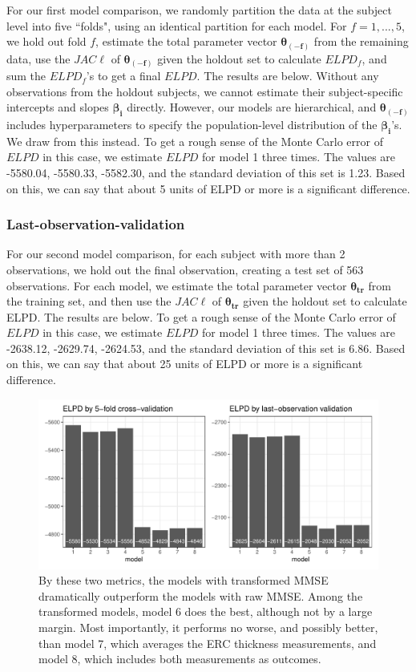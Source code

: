 \documentclass[12pt]{article}
\begin{document}
For our first model comparison, we randomly partition the data at the subject level into five ``folds", using an identical partition for each model. For $f = 1, ..., 5$, we hold out fold $f$, estimate the total parameter vector $\boldsymbol{\theta_{(-f)}}$ from the remaining data, use the $JAC\ell$ of $\boldsymbol{\theta_{(-f)}}$ given the holdout set to calculate $ELPD_f$, and sum the $ELPD_f$'s to get a final $ELPD$. The results are below. Without any observations from the holdout subjects, we cannot estimate their subject-specific intercepts and slopes $\boldsymbol{\beta_{i}}$ directly. However, our models are hierarchical, and $\boldsymbol{\theta_{(-f)}}$ includes hyperparameters to specify the population-level distribution of the $\boldsymbol{\beta_{i}}$'s. We draw from this instead. To get a rough sense of the Monte Carlo error of $ELPD$ in this case, we estimate $ELPD$ for model 1 three times. The values are -5580.04, -5580.33, -5582.30, and the standard deviation of this set is 1.23. Based on this, we can say that about 5 units of ELPD or more is a significant difference. 

\subsubsection{Last-observation-validation}

For our second model comparison, for each subject with more than 2 observations, we hold out the final observation, creating a test set of 563 observations. For each model, we estimate the total parameter vector $\boldsymbol{\theta_{tr}}$ from the training set, and then use the $JAC\ell$ of $\boldsymbol{\theta_{tr}}$ given the holdout set to calculate ELPD. The results are below. To get a rough sense of the Monte Carlo error of $ELPD$ in this case, we estimate $ELPD$ for model 1 three times. The values are -2638.12, -2629.74, -2624.53, and the standard deviation of this set is 6.86. Based on this, we can say that about 25 units of ELPD or more is a significant difference. 

\begin{figure}[H]
\centering
\includegraphics[width=\linewidth]{figures/elpd_plot}
\caption{By these two metrics, the models with transformed MMSE dramatically outperform the models with raw MMSE. Among the transformed models, model 6 does the best, although not by a large margin. Most importantly, it performs no worse, and possibly better, than model 7, which averages the ERC thickness measurements, and model 8, which includes both measurements as outcomes.}
\end{figure}
\end{document}
